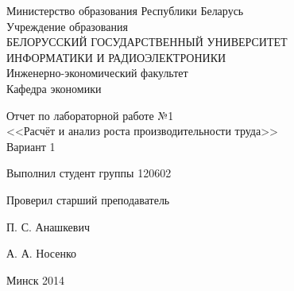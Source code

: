 \thispagestyle{empty}
\setlength{\parindent}{0ex} %

\begin{center}
  Министерство образования Республики Беларусь \\
  \smallskip
  Учреждение образования \\
  БЕЛОРУССКИЙ ГОСУДАРСТВЕННЫЙ УНИВЕРСИТЕТ \\
  ИНФОРМАТИКИ И РАДИОЭЛЕКТРОНИКИ \\
  \smallskip
  Инженерно-экономический факультет \\
  \smallskip
  Кафедра экономики
\end{center}

\vspace{40mm}

\begin{center}
  Отчет по лабораторной работе №1 \\
  <<Расчёт и анализ роста производительности труда>> \\
  Вариант 1
\end{center}

\vspace{60mm}

\begin{minipage}{.55\linewidth}
  Выполнил студент группы 120602

  \smallskip

  Проверил старший преподаватель
\end{minipage}
\hfill
\begin{minipage}{.4\linewidth}
  \begin{flushright}
    П. С. Анашкевич

    \smallskip

    А. А. Носенко
  \end{flushright}
\end{minipage}

\vspace{50mm}
\begin{center}
  Минск 2014
\end{center}

\setlength{\parindent}{5ex} %
